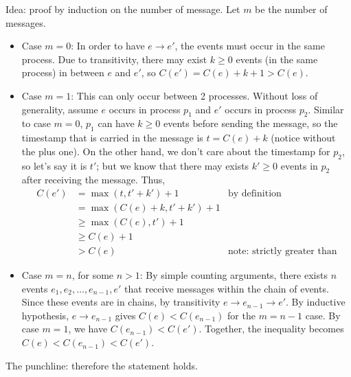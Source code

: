 Idea: proof by induction on the number of message. Let $m$ be the number of messages.

\begin{itemize}
\item
Case $m = 0$:
In order to have $e \rightarrow e'$, the events must occur in the same process.
Due to transitivity, there may exist $k \ge 0$ events (in the same process) in between $e$ and $e'$, so $C(e') = C(e) + k+1 > C(e)$.
\item
Case $m = 1$:
This can only occur between 2 processes.
Without loss of generality, assume $e$ occurs in process $p_1$ and $e'$ occurs in process $p_2$.
Similar to case $m=0$, $p_1$ can have $k \ge 0$ events before sending the message, so the timestamp that is carried in the message is $t = C(e) + k$ (notice without the plus one).
On the other hand, we don't care about the timestamp for $p_2$, so let's say it is $t'$; but we know that there may exists $k' \ge 0$ events in $p_2$ after receiving the message.
Thus,
\begin{align*}
C(e') &= \max(t, t' + k') + 1 & \text{by definition} \\
	&= \max(C(e) + k, t' + k') + 1 \\
	&\ge \max(C(e), t') + 1 \\
	&\ge C(e) + 1 \\
	&> C(e) & \text{note: strictly greater than}
\end{align*}
\item
Case $m = n$, for some $n > 1$:
By simple counting arguments, there exists $n$ events $e_1, e_2, \ldots, e_{n-1},e'$ that receive messages within the chain of events.
Since these events are in chains, by transitivity $e \rightarrow e_{n-1} \rightarrow e'$.
By inductive hypothesis, $e \rightarrow e_{n-1}$ gives $C(e) < C(e_{n-1})$ for the $m = n-1$ case.
By case $m = 1$, we have $C(e_{n-1}) < C(e')$.
Together, the inequality becomes $C(e) < C(e_{n-1}) < C(e')$.
\end{itemize}
The punchline: therefore the statement holds.
